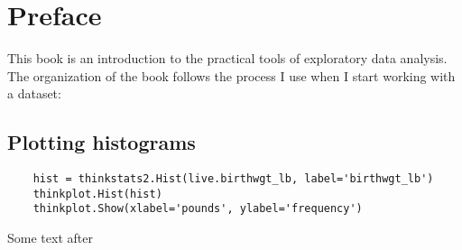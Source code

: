 \documentclass[12pt]{book}
\begin{document}
\chapter{Preface}%
\label{preface}

This book is an introduction to the practical tools of exploratory data analysis.  The
organization of the book follows the process I use when I start working with a dataset:

\section{Plotting histograms}%

\begin{verbatim}
    hist = thinkstats2.Hist(live.birthwgt_lb, label='birthwgt_lb')
    thinkplot.Hist(hist)
    thinkplot.Show(xlabel='pounds', ylabel='frequency')
\end{verbatim}

Some text after
\end{document}
